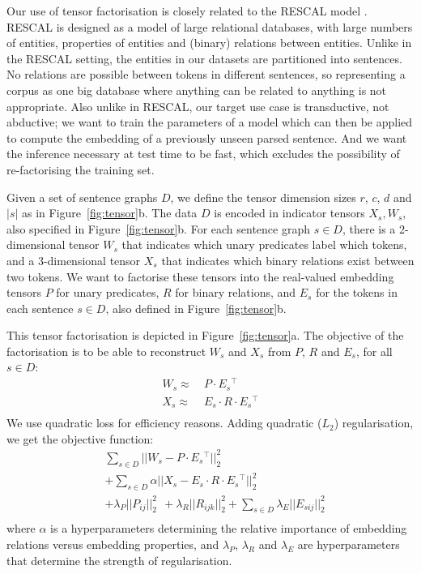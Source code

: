 \documentclass[11pt,a4paper]{article}
\newcommand{\trans}{{}^{\top}}
\begin{document}
Our use of tensor factorisation is closely related to the RESCAL model
\cite{nickel2011,nickel2012}.  RESCAL is designed as a model of large
relational databases, with large numbers of entities, properties of entities
and (binary) relations between entities.
Unlike in the RESCAL setting, the entities in our datasets are partitioned
into sentences.  No relations are possible between tokens in different
sentences, so representing a corpus as one big database where anything can be
related to anything is not appropriate.  Also unlike in RESCAL, our target use
case is transductive, not abductive; we want to train the parameters of a
model which can then be applied to compute the embedding of a previously
unseen parsed sentence.  And we want the inference necessary at test time to
be fast, which excludes the possibility of re-factorising the training set.


Given a set
of sentence graphs $D$, we define the tensor dimension sizes $r$, $c$, $d$
and $|s|$ as in Figure~\ref{fig:tensor}b.  The data $D$ is encoded in
indicator tensors $X_s,W_s$, also specified in Figure~\ref{fig:tensor}b.  For each
sentence graph $s{\in}D$, there is a 2-dimensional tensor $W_{s}$ that indicates
which unary predicates label which tokens, and a 3-dimensional tensor $X_{s}$
that indicates which binary relations exist between two tokens.  We want to
factorise these tensors into the real-valued embedding tensors $P$ for unary
predicates, $R$ for binary relations, and $E_{s}$ for the tokens in each
sentence $s{\in}D$, also defined in Figure~\ref{fig:tensor}b.

This tensor factorisation is depicted in Figure~\ref{fig:tensor}a.  The
objective of the factorisation is to be able to reconstruct $W_s$ and $X_s$
from $P$, $R$ and $E_s$, for all $s{\in}D$:
\vspace{-0.5ex}
\begin{align}
W_s \approx~& P \cdot E_s\!\trans 
\label{eqn:W}\\
X_s \approx~& E_s \cdot R \cdot E_s\!\trans 
\label{eqn:X}
\\[-4ex]\nonumber
\end{align}
We use quadratic loss for efficiency reasons.  Adding quadratic ($L_2$)
regularisation, we get the objective function:
\vspace{-0.5ex}
\begin{align}
\label{eqn:objective}
&
\sum_{s{\in}D}  
 || W_{s} - P \cdot E_{s}\!\trans ||^2_2 
\\&
+\sum_{s{\in}D} 
 \alpha || X_{s} - E_{s} \cdot R \cdot E_{s}\!\trans ||^2_2
\nonumber\\&
+ \lambda_P ||P_{ij}||^2_2
~~+ \lambda_R ||R_{ijk}||^2_2
+\sum_{s{\in}D} \lambda_E ||E_{sij}||^2_2
\nonumber
\\[-4ex]\nonumber
\end{align}
where $\alpha$ is a hyperparameters determining the relative importance of
embedding relations versus embedding properties, and $\lambda_P$, $\lambda_R$
and $\lambda_E$ are hyperparameters that determine the strength of
regularisation.  
\end{document}
